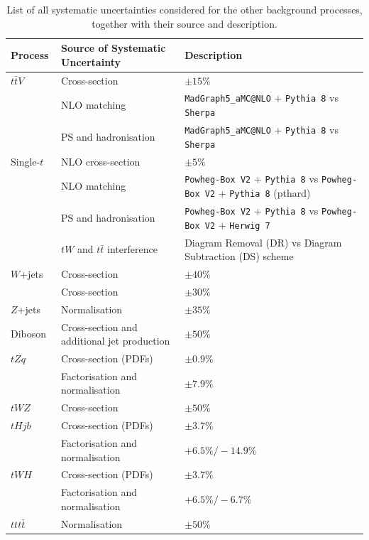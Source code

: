 \begin{table}[h!]
\scriptsize
\hspace*{-1.5cm}
    \centering
    \renewcommand{\arraystretch}{1.2}
    \begin{tabular}{|l|l|l|}
        \hline
        \textbf{Process} & \textbf{Source of Systematic Uncertainty} & \textbf{Description} \\
        \hline
        $t\bar{t}V$~\cite{Campbell:2012dh} & Cross-section & $\pm 15\%$ \\
                          & NLO matching & \verb|MadGraph5_aMC@NLO| + \verb|Pythia 8| vs \verb|Sherpa| \\
                          & PS and hadronisation & \verb|MadGraph5_aMC@NLO| + \verb|Pythia 8| vs \verb|Sherpa| \\
        \hline
        Single-$t$~\cite{Aliev:2010zk,Kant:2014oha,Martin:2009iq}  & NLO cross-section & $\pm 5\%$ \\
                          & NLO matching & \verb|Powheg-Box V2| + \verb|Pythia 8| vs \verb|Powheg-Box V2| + \verb|Pythia 8| (pthard) \\
                          & PS and hadronisation & \verb|Powheg-Box V2| + \verb|Pythia 8| vs \verb|Powheg-Box V2| + \verb|Herwig 7| \\
                          & $tW$ and $t\bar{t}$ interference~\cite{Frixione:2008yi} & Diagram Removal (DR) vs Diagram Subtraction (DS) scheme \\
        \hline
        $W$+jets & Cross-section & $\pm 40\%$ \\
                 & Cross-section & $\pm 30\%$ \\
        \hline
        $Z$+jets & Normalisation & $\pm 35\%$ \\
        \hline
        Diboson~\cite{ATLAS:2016-PhysPUB-Multiboson} & Cross-section and additional jet production & $\pm 50\%$ \\
        \hline
        $tZq$~\cite{Alwall:2014hca} & Cross-section (PDFs) & $\pm 0.9\%$ \\
                   & Factorisation and normalisation & $\pm 7.9\%$ \\
        \hline
        $tWZ$~\cite{Alwall:2014hca} & Cross-section & $\pm 50\%$ \\
        \hline
        $tHjb$ & Cross-section (PDFs) & $\pm 3.7\%$ \\
                     & Factorisation and normalisation & $+6.5\%/ -14.9\%$ \\
        \hline
        $tWH$ & Cross-section (PDFs) & $\pm 3.7\%$ \\
                    & Factorisation and normalisation & $+6.5\%/-6.7\%$ \\
        \hline
        $ttt\bar{t}$ & Normalisation & $\pm 50\%$ \\
        \hline
    \end{tabular}
    \caption{List of all systematic uncertainties considered for the other background processes, together with their source and description.}
    \label{tab:other_backgrounds}
\end{table}


